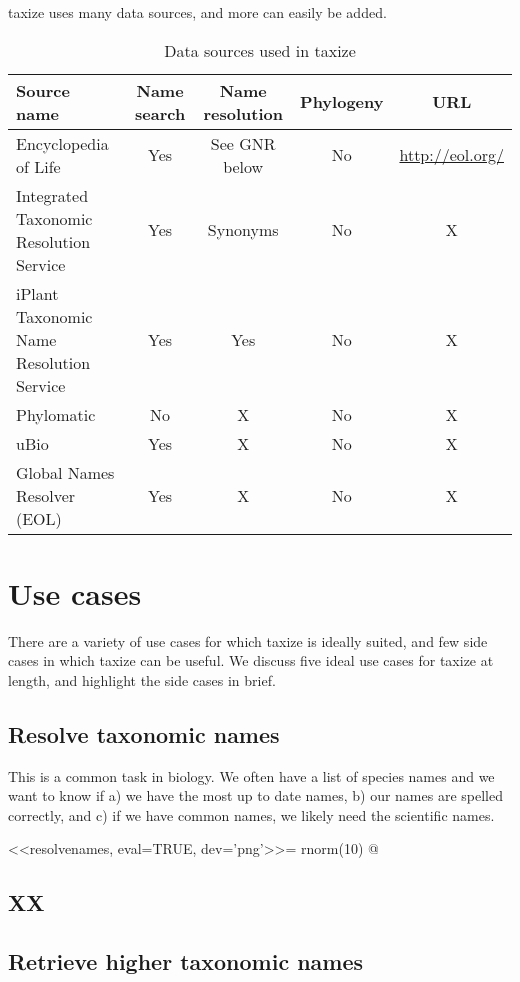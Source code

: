 \documentclass[letterpaper,superscriptaddress,showkeys,longbibliography]{revtex4-1}
\begin{document}
taxize uses many data sources, and more can easily be added. 

\begin{table}[ht]
\caption{Data sources used in taxize} %
\centering %
\begin{tabular}{|l|ccc|c|}
	\hline
Source name &  Name search & Name resolution & Phylogeny & URL  \\
	\hline
Encyclopedia of Life & Yes & See GNR below & No & \url{http://eol.org/} \\
Integrated Taxonomic Resolution Service & Yes & Synonyms & No & X\\
iPlant Taxonomic Name Resolution Service & Yes & Yes & No & X \\
Phylomatic & No & X & No & X \\
uBio & Yes & X & No & X \\
Global Names Resolver (EOL) & Yes & X & No & X \\
	\hline
\end{tabular}
\label{table:nonlin} %
\end{table}

\section{Use cases}

There are a variety of use cases for which taxize is ideally suited, and few side cases in which taxize can be useful. We discuss five ideal use cases for taxize at length, and highlight the side cases in brief.

\subsection{Resolve taxonomic names}

This is a common task in biology. We often have a list of species names and we want to know if a) we have the most up to date names, b) our names are spelled correctly, and c) if we have common names, we likely need the scientific names. 

<<resolvenames, eval=TRUE, dev='png'>>=
rnorm(10)
@

\subsection{XX}



\subsection{Retrieve higher taxonomic names}
\end{document}
